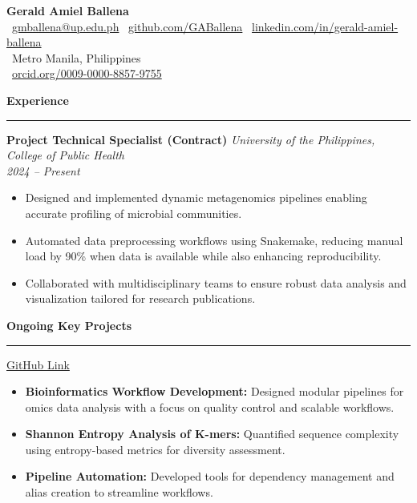 \documentclass[a4paper,10pt]{article}
\newcommand{\sectiontitle}[1]{\vspace{10pt}\textbf{\Large #1}\vspace{5pt}\hrule\vspace{10pt}}
\begin{document}
	
	\begin{center}
		{\Huge \textbf{Gerald Amiel Ballena}} \\
		\vspace{3pt}
		\faEnvelope \ \href{mailto:gmballena@up.edu.ph}{gmballena@up.edu.ph} \quad
		\faGithub \ \href{https://github.com/GABallena}{github.com/GABallena} \quad
		\faLinkedin \ \href{https://linkedin.com/in/gerald-amiel-ballena}{linkedin.com/in/gerald-amiel-ballena} \\
		\vspace{3pt}
		\faMapMarker \ Metro Manila, Philippines \\
		 \ \href{https://orcid.org/0009-0000-8857-9755}{orcid.org/0009-0000-8857-9755}
	\end{center}
	
	\sectiontitle{Experience}
	
	\textbf{Project Technical Specialist (Contract)} \hfill \textit{University of the Philippines, College of Public Health} \\
	\textit{2024 – Present}
\begin{itemize}[left=0pt]
	\item Designed and implemented dynamic metagenomics pipelines enabling accurate profiling of microbial communities.
	\item Automated data preprocessing workflows using Snakemake, reducing manual load by 90\% when data is available while also enhancing reproducibility.
	\item Collaborated with multidisciplinary teams to ensure robust data analysis and visualization tailored for research publications.
\end{itemize}

	
	\sectiontitle{Ongoing Key Projects} \dotfill \href{https://github.com/GABallena}{GitHub Link}
	\begin{itemize}[left=0pt]
		\item \textbf{Bioinformatics Workflow Development:} Designed modular pipelines for omics data analysis with a focus on quality control and scalable workflows.
		\item \textbf{Shannon Entropy Analysis of K-mers:} Quantified sequence complexity using entropy-based metrics for diversity assessment.
		\item \textbf{Pipeline Automation:} Developed tools for dependency management and alias creation to streamline workflows.
	\end{itemize}
	
\end{document}
